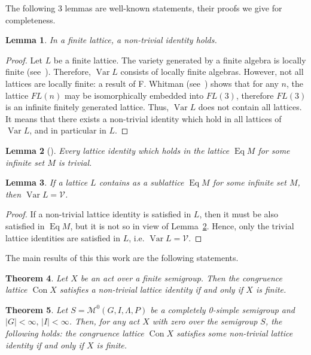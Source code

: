 \documentclass{birkau}
\numberwithin{equation}{section}
\theoremstyle{plain}
\newtheorem{theorem}{Theorem}[section]
\newtheorem{lemma}[theorem]{Lemma}
\theoremstyle{definition}
\DeclareMathOperator{\Con}{Con}
\DeclareMathOperator{\Eq}{Eq}
\DeclareMathOperator{\Var}{Var}
\begin{document}
	The following 3 lemmas are well-known statements, their proofs we give for completeness.
	
	\begin{lemma} \label{lb0}
	    In a finite lattice, a non-trivial identity holds.
	\end{lemma}
	\begin{proof}
	    Let $L$ be a finite lattice. The variety generated by a finite algebra is locally finite (see~\cite[Corollary 3.14]{kon}). Therefore, $\Var L$ consists of locally finite algebras. However, not all lattices are locally finite: a result of F. Whitman (see~\cite[Theorem 1.28]{free_lattices}) shows that for any $n$, the lattice $FL(n)$ may be isomorphically embedded into $FL(3)$, therefore $FL(3)$ is an infinite finitely generated lattice. Thus, $\Var L$ does not contain all lattices. It means that there exists a non-trivial identity which hold in all lattices of $\Var L$, and in particular in $L$.
	\end{proof}
	
	\begin{lemma}[\cite{sachs}] \label{lemma:b1}
	    Every lattice identity which holds in the lattice $\Eq M$ for some infinite set $M$ is trivial.
	\end{lemma}
	
	\begin{lemma} \label{la1}
	    If a lattice $L$ contains as a sublattice $\Eq M$ for some infinite set $M$, then $\Var L = \mathcal{V}$.
	\end{lemma}
	\begin{proof}
	    If a non-trivial lattice identity is satisfied in $L$, then it must be also satisfied in $\Eq M$, but it is not so in view of Lemma~\ref{lemma:b1}. Hence, only the trivial lattice identities are satisfied in $L$, i.e. $\Var L = \mathcal{V}$.
	\end{proof}

The main results of this this work are the following statements.
	
	\begin{theorem} \label{t01}
	    Let $X$ be an act over a finite semigroup. Then the congruence lattice $\Con X$ satisfies a non-trivial lattice identity if and only if $X$ is finite.
	\end{theorem}
	
	\begin{theorem} \label{t02}
	    Let $S = \mathcal{M}^0(G,I,\Lambda,P)$ be a completely 0-simple semigroup and $|G| < \infty,\, |I| < \infty $. Then, for any act $X$ with zero over the semigroup $S$, the following holds: the congruence lattice $\Con X$ satisfies some non-trivial lattice identity if and only if $X$ is finite.
	\end{theorem}
	
\end{document}
